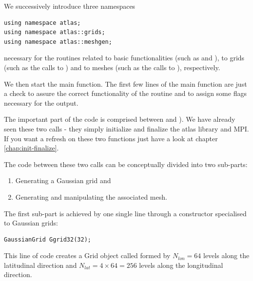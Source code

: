 We successively introduce three namespaces
%
\begin{lstlisting}[style=CStyleNoLine]
using namespace atlas;
using namespace atlas::grids;
using namespace atlas::meshgen;
\end{lstlisting}
%
necessary for the routines related to \Atlas basic 
functionalities (such as  and ), 
to grids (such as the calls to ) and to meshes (such as the 
calls to ), respectively.
 
We then start the main function. The first few lines of the main function 
are just a check to assure the correct functionality of the routine and 
to assign some flags necessary for the output. 

The important part of the code is comprised between  
and ). We have already seen these two calls - they 
simply initialize and finalize the atlas library and MPI. If you want a 
refresh on these two functions just have a look at chapter \ref{chap:init-finalize}.

The code between these two calls can be conceptually divided into two 
sub-parts: 
%
\begin{enumerate}
\item Generating a Gaussian grid and
\item Generating and manipulating the associated mesh.
\end{enumerate}
%
The first sub-part is achieved by one single line through a constructor 
specialised to Gaussian grids:
%
\begin{lstlisting}[style=CStyleNoLine]
GaussianGrid Ggrid32(32);
\end{lstlisting}
%
This line of code creates a Grid object called  formed 
by $N_{lon} = 64$ levels along the latitudinal direction and $N_{lat} 
= 4 \times 64 = 256$ levels along the longitudinal direction.

